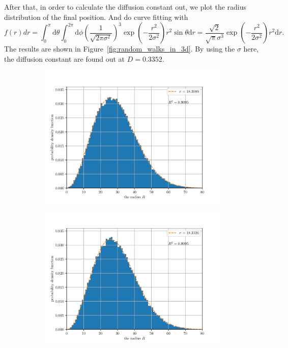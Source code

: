 \documentclass[paper=a4, fontsize=11pt]{scrartcl} %
\numberwithin{equation}{section} %
\numberwithin{figure}{section} %
\numberwithin{table}{section} %
\begin{document}
After that, in order to calculate the diffusion constant out, we plot the radius distribution of the final position. And do curve fitting with
\begin{equation}
	f\left( r \right)dr=\int_{0}^{\pi}\mathrm{d}\theta\int_{0}^{2\pi}\mathrm{d}\phi\left( \frac{1}{\sqrt{2\pi\sigma^2}} \right)^3\exp\left( -\frac{r^2}{2\sigma^2} \right)r^2\sin\theta\mathrm{d}r=\frac{\sqrt{2}}{\sqrt{\pi}\sigma^3}\exp\left( -\frac{r^2}{2\sigma^2} \right)r^2\mathrm{d}r.
	\label{equ:the_radius_distribution}
\end{equation}
The results are shown in Figure~\ref{fig:random_walks_in_3d}. By using the \(\sigma\) here, the diffusion constant are found out at \(D=0.3352\).\par
\begin{figure}[!ht]
	\centering
	\begin{subfigure}[!b]{0.495\textwidth}
		\centering
		\includegraphics[width=\linewidth]{figure_2_0.pdf}
		\caption{}
	\end{subfigure}
	\begin{subfigure}[!b]{0.495\textwidth}
		\centering
		\includegraphics[width=\linewidth]{figure_2_1.pdf}

\end{subfigure}
\end{figure}
\end{document}
